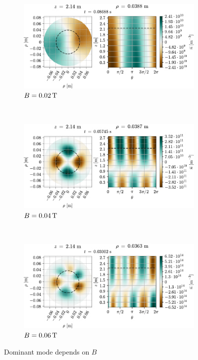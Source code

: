{
\begin{figure}[htbp]
    \vspace*{-1cm}
    \centering
    \begin{subfigure}[h]{1.00\textwidth}
        \centering
        \includegraphics{fig/results/modesDiffScanVals/B002}
        \caption{$B=0.02 \, \text{T}$}
        \label{fig:B002}
    \end{subfigure}%
    \\
    \begin{subfigure}[h]{1.00\textwidth}
        \centering
        \includegraphics{fig/results/modesDiffScanVals/B004}
        \caption{$B=0.04 \, \text{T}$}
        \label{fig:B004}
    \end{subfigure}
    \\
    \begin{subfigure}[h]{1.00\textwidth}
        \centering
        \includegraphics{fig/results/modesDiffScanVals/B006}
        \caption{$B=0.06 \, \text{T}$}
        \label{fig:B006}
    \end{subfigure}
    \caption{Dominant mode depends on $B$}
    \label{fig:dominatingMode}
\end{figure}
}
%

